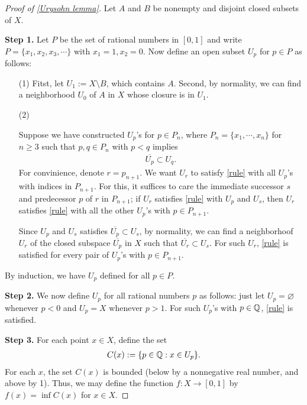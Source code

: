 \begin{proof}[Proof of \cref{Urysohn lemma}]
    Let $A$ and $B$ be nonempty and disjoint closed subsets of $X$.

    \textbf{Step 1.}
    Let $P$ be the set of rational numbers in $[0, 1]$ and write $P=\{x_1, x_2, x_3, \cdots\}$ with $x_1=1, x_2=0$.
    Now define an open subset $U_p$ for $p\in P$ as follows:
    \begin{enumerate}
        \item[(1)]
        {
            Fitst, let $U_1:=X\setminus B$, which contains $A$.
            Second, by normality, we can find a neighborhood $U_0$ of $A$ in $X$ whose closure is in $U_1$.
        }
        \item[(2)]
        {
            Suppose we have constructed $U_p$'s for $p\in P_n$, where $P_n=\{x_1, \cdots, x_n\} $ for $n\geq 3$ such that $p, q\in P_n$ with $p<q$ implies
            \begin{align}\label{rule}
                \overline{U_p}\subset U_q.
            \end{align}
            For convinience, denote $r=p_{n+1}$.
            We want $U_r$ to satisfy \cref{rule} with all $U_p$'s with indices in $P_{n+1}$.
            For this, it suffices to care the immediate successor $s$ and predecessor $p$ of $r$ in $P_{n+1}$; if $U_r$ satisfies \cref{rule} with $U_p$ and $U_s$, then $U_r$ satisfies \cref{rule} with all the other $U_p$'s with $p\in P_{n+1}$.

            Since $U_p$ and $U_s$ satisfies $\overline{U_p}\subset U_s$, by normality, we can find a neighborhoof $U_r$ of the closed subspace $\overline{U_p}$ in $X$ such that $\overline{U_r}\subset U_s$.
            For such $U_r$, \cref{rule} is satisfied for every pair of $U_p$'s with $p\in P_{n+1}$.
        }
    \end{enumerate}
    By induction, we have $U_p$ defined for all $p\in P$.

    \textbf{Step 2.}
    We now define $U_p$ for all rational numbers $p$ as follows: just let $U_p=\varnothing$ whenever $p<0$ and $U_p=X$ whenever $p>1$.
    For such $U_p$'s with $p\in{\mathbb{Q}}$, \cref{rule} is satisfied.
    
    \textbf{Step 3.}
    For each point $x\in X$, define the set
    \begin{align*}
        C(x):=\{p\in{\mathbb{Q}}:x\in U_p\}.
    \end{align*}
    For each $x$, the set $C(x)$ is bounded (below by a nonnegative real number, and above by 1).
    Thus, we may define the function $f: X\rightarrow[0, 1]$ by $f(x)=\inf C(x)$ for $x\in X$.


\end{proof}

